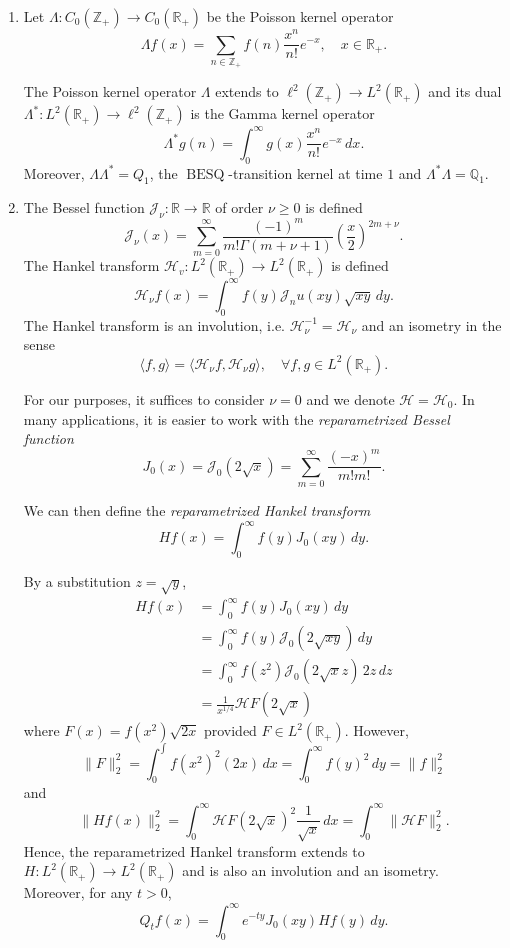 \documentclass[11pt,a4,reqno]{amsart}
\numberwithin{equation}{section}
\theoremstyle{definition}
\theoremstyle{remark}
\newcommand{\bb}[1]{\mathbb{#1}}
\newcommand{\cl}[1]{\mathcal{#1}}
\newcommand{\R}{\bb{R}}
\newcommand{\Z}{\bb{Z}}
\DeclareMathOperator{\besq}{BESQ}
\newcommand{\beq}{\begin{equation}}
\newcommand{\eeq}{\end{equation}}
\begin{document}
	\begin{enumerate}
		
		\item Let $\Lambda : C_0(\Z_+) \to C_0(\R_+)$ be the Poisson kernel operator 
		\beq \label{eqn:poisson_kernel} \Lambda f(x) = \sum_{n \in \Z_+} f(n) \frac{x^n}{n!} e^{-x} , \quad x \in \R_+. \eeq
		
		The Poisson kernel operator $\Lambda$ extends to $\ell^2(\Z_+) \to L^2(\R_+)$ and its dual $\Lambda^* : L^2(\R_+) \to \ell^2(\Z_+)$ is the Gamma kernel operator 
		\beq \label{eqn:gamma_kernel} \Lambda^*g(n) = \int_0^\infty g(x) \frac{x^n}{n!} e^{-x} \, dx . \eeq
		Moreover, $\Lambda \Lambda^* = Q_1$, the $\besq$-transition kernel at time $1$ and $\Lambda^* \Lambda = \bb{Q}_1$. 
		
		\item The Bessel function $\cl{J}_\nu : \R \to \R$ of order $\nu \geq 0$ is defined 
		\beq \cl{J}_\nu(x) = \sum_{m = 0}^\infty \frac{(-1)^m}{m! \Gamma(m + \nu + 1)} \left ( \frac{x}{2} \right )^{2m + \nu} . \eeq
		The Hankel transform $\cl{H}_v : L^2(\R_+) \to L^2(\R_+)$ is defined
		\beq \cl{H}_\nu f(x) = \int_0^\infty f(y) \cl{J}_nu(xy) \sqrt{xy} \, dy . \eeq
		The Hankel transform is an involution, i.e. $\cl{H}_\nu^{-1} = \cl{H}_\nu$ and an isometry in the sense
		\beq \langle f, g \rangle = \langle \cl{H}_\nu f, \cl{H}_\nu g \rangle, \quad \forall f, g \in L^2(\R_+) . \eeq
		
		For our purposes, it suffices to consider $\nu = 0$ and we denote $\cl{H} = \cl{H}_0$. In many applications, it is easier to work with the \textit{reparametrized Bessel function} 
		\beq J_0(x) = \cl{J}_0(2 \sqrt{x}) = \sum_{m = 0}^\infty \frac{(-x)^m}{m! m!} . \eeq
		
		We can then define the \textit{reparametrized Hankel transform}
		\beq Hf(x) = \int_0^\infty f(y) J_0(xy) \,dy . \eeq
		
		By a substitution $z = \sqrt{y}$, 
		\begin{align*}
			Hf(x) 
				&= \int_0^\infty f(y) J_0(xy) \,dy \\
				&= \int_0^\infty f(y) \cl{J}_0(2 \sqrt{xy}) \,dy \\
				&= \int_0^\infty f(z^2) \cl{J}_0(2 \sqrt{x} z) \, 2z \, dz \\
				&= \frac{1}{x^{1/4}} \cl{H}F(2\sqrt{x}) 
		\end{align*}
		where $F(x) = f(x^2)\sqrt{2x}$ provided $F \in L^2(\R_+)$. However, 
		\[ \|F\|_2^2 = \int_0^\int f(x^2)^2 (2x) \, dx = \int_0^\infty f(y)^2 \, dy = \|f\|_2^2 \] 
		and 
		\[ \|Hf(x)\|_2^2 = \int_0^\infty \cl{H}F(2\sqrt{x})^2 \frac{1}{\sqrt{x}} \, dx = \int_0^\infty \|\cl{H}F\|_2^2 . \]
		Hence, the reparametrized Hankel transform extends to $H : L^2(\R_+) \to L^2(\R_+)$ and is also an involution and an isometry. Moreover, for any $t > 0$, 
		\beq \label{eqn:besq_hankel} Q_t f(x) = \int_0^\infty e^{-ty} J_0(xy) Hf(y) \, dy . \eeq
		
		
		
		
	\end{enumerate}
\end{document}
